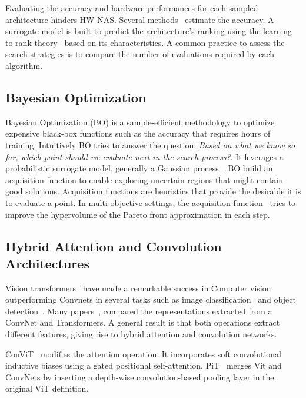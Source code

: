 \documentclass[conference]{IEEEtran}
\begin{document}
Evaluating the accuracy and hardware performances for each sampled architecture hinders HW-NAS. Several methods~\cite{DBLP:conf/nips/WhiteZRLH21} estimate the accuracy. A surrogate model is built to predict the architecture's ranking using the learning to rank theory~\cite{DBLP:conf/icml/WistubaP20, DBLP:conf/arabwic/BenmezianeOMN21} based on its characteristics. A common practice to assess the search strategies is to compare the number of evaluations required by each algorithm. 



\subsection{Bayesian Optimization}
Bayesian Optimization (BO) is a sample-efficient methodology to optimize expensive black-box functions such as the accuracy that requires hours of training. Intuitively BO tries to answer the question: \textit{Based on what we know so far, which point should we evaluate next in the search process?}. It leverages a probabilistic surrogate model, generally a Gaussian process~\cite{10.5555/3221315.3221581}. BO build an acquisition function to enable exploring uncertain regions that might contain good solutions. Acquisition functions are heuristics that provide the  desirable it is to evaluate a point. 
In multi-objective settings, the acquisition function~\cite{10.5555/3221315.3221581} tries to improve the hypervolume of the Pareto front approximation in each step. 
\vspace{-0.25cm}
\subsection{Hybrid Attention and Convolution Architectures}


Vision transformers~\cite{DBLP:conf/iclr/DosovitskiyB0WZ21} have made a remarkable success in Computer vision outperforming Convnets in several tasks such as image classification~\cite{DBLP:conf/nips/DaiLLT21} and object detection~\cite{DBLP:journals/corr/abs-2203-03605}.
Many papers~\cite{DBLP:conf/nips/RaghuUKZD21},\cite{tuli2021convolutional} compared the representations extracted from a ConvNet and Transformers. A general result is that both operations extract different features, giving rise to hybrid attention and convolution networks.

ConViT~\cite{convit} modifies the attention operation. It incorporates soft convolutional inductive biases using a gated positional self-attention. PiT~\cite{pit} merges Vit and ConvNets by inserting a depth-wise convolution-based pooling layer in the original ViT definition.  \vspace{-0.5cm}
\end{document}
